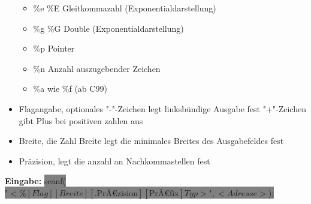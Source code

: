 \documentclass[10pt,a5paper]{article}
\newcommand{\cbg}[1]{\colorbox{grey}{#1}}
\begin{document}
\begin{itemize}
\begin{itemize}
\item \%e \%E Gleitkommazahl (Exponentialdarstellung)
\item \%g \%G Double (Exponentialdarstellung)
\item \%p Pointer
\item \%n Anzahl auszugebender Zeichen
\item \%a wie \%f (ab C99)
\end{itemize}
\item Flagangabe, optionales "-"-Zeichen legt linksbündige Ausgabe fest "+"-Zeichen gibt Plus bei positiven zahlen aus
\item Breite, die Zahl Breite legt die minimales Breites des Ausgabefeldes fest
\item Präzision, legt die anzahl an Nachkommastellen fest
\end{itemize}
\textbf{Eingabe:} \cbg{scanf(\ensuremath{\text{"}< \%[Flag][Breite][.\text{PrÃ€zision}][\text{PrÃ€fix}]Typ>\text{"},<Adresse>});}
\end{document}
